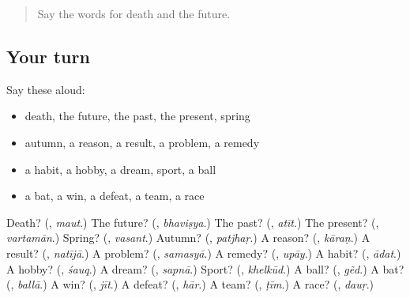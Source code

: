 \label{lesson:HI-R224-second-pass-words-from-chapters-221-224}



\begin{quote}
Say the words for death and the future.
\end{quote}

\subsection*{Your turn}
Say these aloud:

\begin{itemize}
\raggedright
  \item death, the future, the past, the present, spring
  \item autumn, a reason, a result, a problem, a remedy
  \item a habit, a hobby, a dream, sport, a ball
  \item a bat, a win, a defeat, a team, a race
\end{itemize}

\begin{tcolorbox}[breakable,colback=teal!4,colframe=teal!35!black,title={Before you move on}]
Death? (\textbf{}, \emph{maut}.) The future? (\textbf{}, \emph{bhaviṣya}.) The past? (\textbf{}, \emph{atīt}.) The present? (\textbf{}, \emph{vartamān}.) Spring? (\textbf{}, \emph{vasant}.) Autumn? (\textbf{}, \emph{patjhaṛ}.) A reason? (\textbf{}, \emph{kāraṇ}.) A result? (\textbf{}, \emph{natījā}.) A problem? (\textbf{}, \emph{samasyā}.) A remedy? (\textbf{}, \emph{upāy}.) A habit? (\textbf{}, \emph{ādat}.) A hobby? (\textbf{}, \emph{śauq}.) A dream? (\textbf{}, \emph{sapnā}.) Sport? (\textbf{}, \emph{khelkūd}.) A ball? (\textbf{}, \emph{gẽd}.) A bat? (\textbf{}, \emph{ballā}.) A win? (\textbf{}, \emph{jīt}.) A defeat? (\textbf{}, \emph{hār}.) A team? (\textbf{}, \emph{ṭīm}.) A race? (\textbf{}, \emph{dauṛ}.)
\end{tcolorbox}
